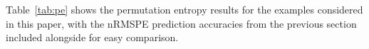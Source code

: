 \documentclass{article}
\begin{document}
Table~\ref{tab:pe} shows the permutation entropy results for the
examples considered in this paper, with the nRMSPE prediction
accuracies from the previous section included alongside for easy
comparison.
%
%
%
\end{document}
